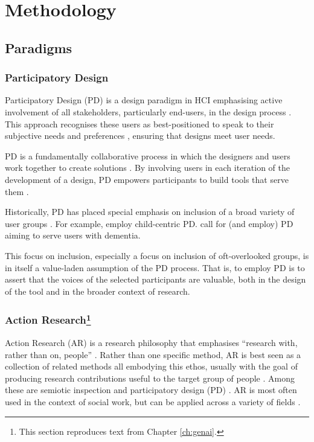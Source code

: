 \chapter{\label{ch:methods}Methodology}

\minitoc

\section{Paradigms}
\subsection{Participatory Design}\label{ssec:participatory_design}
Participatory Design (PD) is a design paradigm in HCI emphasising active involvement of all stakeholders, particularly end-users, in the design process \cite{Hussain2014OverviewOV}. This approach recognises these users as best-positioned to speak to their subjective needs and preferences \cite{Hussain2014OverviewOV}, ensuring that designs meet user needs.

PD is a fundamentally collaborative process in which the designers and users work together to create solutions \cite{Tokranova2022ApplyingPD}. By involving users in each iteration of the development of a design, PD empowers participants to build tools that serve them \cite{Hussain2014OverviewOV}.

Historically, PD has placed special emphasis on inclusion of a broad variety of user groups \cite{Brankaert2019IntersectionsIH}. For example, \textcite{10.1145/3544549.3573821,10.1145/3544548.3580933,Chowdhury2023ReflectionsOO} employ child-centric PD. \textcite{Brankaert2019IntersectionsIH} call for (and employ) PD aiming to serve users with dementia.

This focus on inclusion, especially a focus on inclusion of oft-overlooked groups, is in itself a value-laden assumption of the PD process. That is, to employ PD is to assert that the voices of the selected participants are valuable, both in the design of the tool and in the broader context of research.

\subsection[Action Research]{\label{ssec:action_research}Action Research\footnote{This section reproduces text from Chapter \ref{ch:genai}.}}
Action Research (AR) is a research philosophy that emphasises ``research with, rather than on, people'' \cite{bradbury_action_2003}. Rather than one specific method, AR is best seen as a collection of related methods all embodying this ethos, usually with the goal of producing research contributions useful to the target group of people \cite{lu_organizing_2023}. Among these are semiotic inspection \cite{DeSouza_Leitão_2009,Alvarado_Waern_2018} and participatory design  (PD) \cite{braun_using_2006,Griffiths_Johnson_Hartley_2007,blythe2014research,Knapp_Zeratzky_Kowitz_2016}. AR is most often used in the context of social work, but can be applied across a variety of fields \cite{dombrowski_social_2016,lu_organizing_2023}. 

